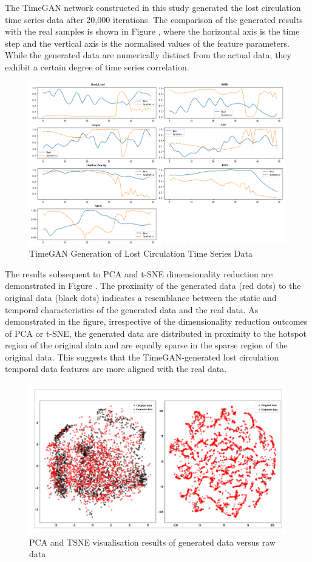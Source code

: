 \documentclass[journal,article,submit,pdftex,moreauthors]{Definitions/mdpi}
\begin{document}
The TimeGAN network constructed in this study generated the lost circulation time series data after 20,000 iterations. The comparison of the generated results with the real samples is shown in Figure   \label{fig:TimeGAN Generation of Lost Circulation Time Series Data}, where the horizontal axis is the time step and the vertical axis is the normalised values of the feature parameters. While the generated data are numerically distinct from the actual data, they exhibit a certain degree of time series correlation. 

\begin{figure}[h]
    \centering
    \includegraphics[width=0.75\linewidth]{图片/timeGan数据生成.png}
    \caption{TimeGAN Generation of Lost Circulation Time Series Data}
    \label{fig:TimeGAN Generation of Lost Circulation Time Series Data}
\end{figure}


The results subsequent to PCA and t-SNE dimensionality reduction are demonstrated in Figure \label{fig:PCA and TSNE visualisation results of generated data versus raw data}. The proximity of the generated data (red dots) to the original data (black dots) indicates a resemblance between the static and temporal characteristics of the generated data and the real data. As demonstrated in the figure, irrespective of the dimensionality reduction outcomes of PCA or t-SNE, the generated data are distributed in proximity to the hotspot region of the original data and are equally sparse in the sparse region of the original data. This suggests that the TimeGAN-generated lost circulation temporal data features are more aligned with the real data.

\begin{figure}[h]
    \centering
    \includegraphics[width=0.75\linewidth]{图片/pca tsne.png}
    \caption{PCA and TSNE visualisation results of generated data versus raw data}
    \label{fig:PCA and TSNE visualisation results of generated data versus raw data}
\end{figure}
\end{document}
